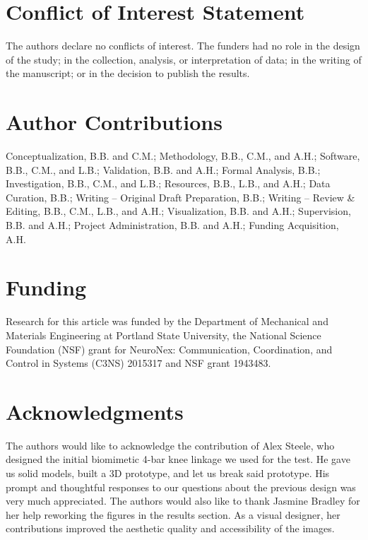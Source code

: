 \documentclass[utf8]{FrontiersinHarvard} %
\begin{document}


\section*{Conflict of Interest Statement}
The authors declare no conflicts of interest. The funders had no role in the design of the study; in the collection, analysis, or interpretation of data; in the writing of the manuscript; or in the decision to publish the results.

\section*{Author Contributions}
Conceptualization, B.B. and C.M.; Methodology, B.B., C.M., and A.H.; Software, B.B., C.M., and L.B.; Validation, B.B. and A.H.; Formal Analysis, B.B.; Investigation, B.B., C.M., and L.B.; Resources, B.B., L.B., and A.H.; Data Curation, B.B.; Writing – Original Draft Preparation, B.B.; Writing – Review \& Editing, B.B., C.M., L.B., and A.H.; Visualization, B.B. and A.H.; Supervision, B.B. and A.H.; Project Administration, B.B. and A.H.; Funding Acquisition, A.H.

\section*{Funding}
Research for this article was funded by the Department of Mechanical and Materials Engineering at Portland State University, the National Science Foundation (NSF) grant for NeuroNex: Communication, Coordination, and Control in Systems (C3NS) 2015317 and NSF grant 1943483. 


\section*{Acknowledgments}
The authors would like to acknowledge the contribution of Alex Steele, who designed the initial biomimetic 4-bar knee linkage we used for the test. He gave us solid models, built a 3D prototype, and let us break said prototype. His prompt and thoughtful responses to our questions about the previous design was very much appreciated. The authors would also like to thank Jasmine Bradley for her help reworking the figures in the results section. As a visual designer, her contributions improved the aesthetic quality and accessibility of the images. 
\end{document}
